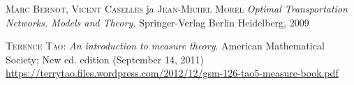 
\appendix
\backmatter
\begin{thebibliography}{30}


\textsc{Marc Bernot}, \textsc{Vicent Caselles} ja \textsc{Jean-Michel Morel}
\textit{Optimal Transportation Networks. Models and Theory.}
Springer-Verlag Berlin Heidelberg, 2009

\textsc{Terence Tao}:
\textit{An introduction to measure theory}.
American Mathematical Society; New ed. edition (September 14, 2011) \\
\url{https://terrytao.files.wordpress.com/2012/12/gsm-126-tao5-measure-book.pdf}


\end{thebibliography}

